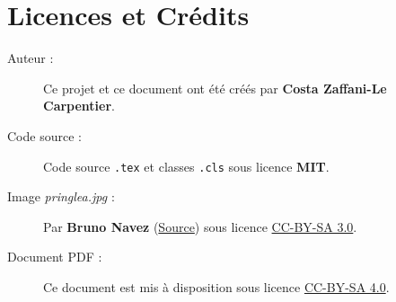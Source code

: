 \section{Licences et Crédits}

\begin{description}
    \item[Auteur :] Ce projet et ce document ont été créés par \textbf{Costa Zaffani-Le Carpentier}.
    \item[Code source :] Code source \texttt{.tex} et classes \texttt{.cls} sous licence \textbf{MIT}.
    \item[Image \textit{pringlea.jpg} :] Par \textbf{Bruno Navez} (\href{https://commons.wikimedia.org/wiki/File:Pringlea_antiscorbutica.JPG}{Source}) sous licence \href{https://creativecommons.org/licenses/by-sa/3.0/deed.fr}{CC-BY-SA 3.0}.
    \item[Document PDF :] Ce document est mis à disposition sous licence \href{https://creativecommons.org/licenses/by-sa/4.0/deed.fr}{CC-BY-SA 4.0}.
\end{description}